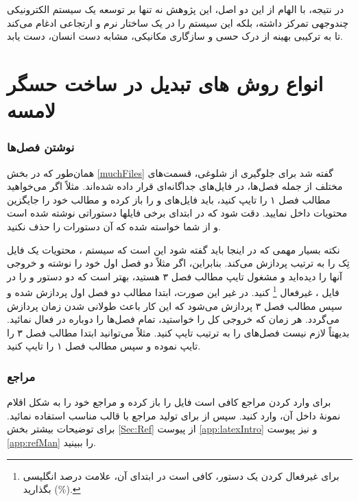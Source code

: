 در نتیجه، با الهام از این دو اصل، این  پژوهش نه تنها بر توسعه یک سیستم الکترونیکی چندوجهی تمرکز داشته، بلکه این سیستم را در یک ساختار نرم و ارتجاعی ادغام می‌کند تا به ترکیبی بهینه از درک حسی و سازگاری مکانیکی، مشابه دست انسان، دست یابد.

\section{انواع روش های تبدیل در ساخت حسگر لامسه}

\subsubsection{نوشتن فصل‌ها}
همان‌طور که در بخش \ref{muchFiles} گفته شد برای جلوگیری از شلوغی، قسمت‌های مختلف \پ از جمله فصل‌ها، در فایل‌های جداگانه‌ای قرار داده شده‌اند. 
مثلاً اگر می‌خواهید مطالب فصل ۱ را تایپ کنید، باید فایل‌های 
و
را باز کرده و مطالب خود را جایگزین محتویات داخل 
نمایید. دقت شود که در ابتدای برخی فایلها دستوراتی نوشته شده است و از شما خواسته شده که آن دستورات را حذف نکنید.


نکته بسیار مهمی که در اینجا باید گفته شود این است که سیستم \lr{\TeX}، محتویات یک فایل تِک را به ترتیب پردازش می‌کند.  بنابراین، اگر مثلاً  دو فصل اول خود را نوشته و خروجی آنها را دیده‌اید و مشغول تایپ مطالب فصل ۳ هستید، بهتر است
که دو دستور 
\verb!!
و
\verb!!
را در فایل 
،
غیرفعال%
\footnote{
برای غیرفعال کردن یک دستور، کافی است در ابتدای آن، علامت درصد انگلیسی (\%) بگذارید.
}
 کنید. در غیر این صورت، ابتدا مطالب دو فصل اول پردازش شده و سپس مطالب فصل ۳ پردازش می‌شود که این کار باعث طولانی شدن زمان پردازش می‌گردد. هر زمان که خروجی کل \پ را خواستید، تمام فصل‌ها را دوباره در
فعال نمائید.
بدیهتاً لازم نیست فصل‌های \پ را به ترتیب تایپ کنید. مثلاً می‌توانید ابتدا مطالب فصل ۳ را تایپ نموده و سپس مطالب فصل ۱ را تایپ کنید. 
\subsubsection{مراجع}
برای وارد کردن مراجع \پ کافی است فایل 
را باز کرده و مراجع خود را به شکل اقلام نمونهٔ داخل آن، وارد کنید.  سپس از  برای تولید مراجع با قالب مناسب استفاده نمائید. برای توضیحات بیشتر بخش \ref{Sec:Ref} از پیوست \ref{app:latexIntro} و نیز پیوست \ref{app:refMan} را ببینید.

